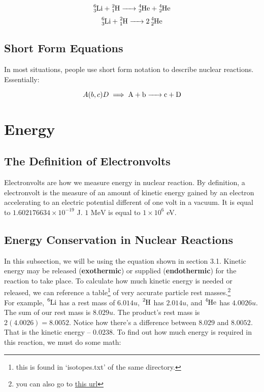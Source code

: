 \documentclass{article}
\begin{document}
\begin{multicols*}{2}
    \[ \ce{^6_3Li + ^2_1H -> ^4_2He + ^4_2He} \]
    \[ \ce{^6_3Li + ^2_1H -> 2 ^4_2He} \]

    \subsection{Short Form Equations}
    In most situations, people use short form notation to describe nuclear reactions.
    Essentially:

    \[ A(b,c)D \implies \ce{A + b -> c + D}\]

    \section{Energy}
    \subsection{The Definition of Electronvolts}
    Electronvolts are how we measure energy in nuclear reaction. By definition,
    a electronvolt is the measure of an amount of kinetic energy gained by
    an electron accelerating to an electric potential different of one volt
    in a vacuum. It is equal to $1.602176634 \times 10^{-19}$ J. $1 \text{ MeV}$
    is equal to $1 \times 10^6$ eV.

    \subsection{Energy Conservation in Nuclear Reactions}
    In this subsection, we will be using the equation shown in section 3.1.
    Kinetic energy may be released (\textbf{exothermic}) or supplied
    (\textbf{endothermic}) for the reaction to take place. To calculate how
    much kinetic energy is needed or released, we can reference a table\footnote{this is found in `isotopes.txt' of the same directory.}
    of very accurate particle rest masses.\footnote{you can also go to \href{https://physics.nist.gov/cgi-bin/Compositions/stand_alone.pl?ele=&all=all&ascii=ascii&isotype=all}{this url}}\\

    For example, $\ce{^6Li}$ has a rest mass of $6.014 u$, $\ce{^2H}$ has
    $2.014 u$, and $\ce{^4He}$ has $4.0026 u$. The sum of our rest mass is
    $8.029 u$. The product's rest mass is $2(4.0026) = 8.0052$. Notice how
    there's a difference between $8.029$ and $8.0052$. That is the kinetic
    energy -- $0.0238$. To find out how much energy is required in this
    reaction, we must do some math:


\end{multicols*}
\end{document}
